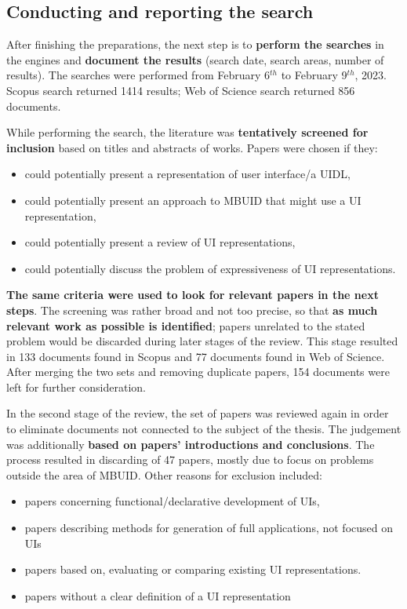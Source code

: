 \subsection{Conducting and reporting the search}\label{subsec:conducting-and-reporting-the-search}

After finishing the preparations, the next step is to \textbf{perform the searches} in the engines and \textbf{document the results} (search date, search areas, number of results).
The searches were performed from February 6$^{th}$ to February 9$^{th}$, 2023.
Scopus search returned 1414 results;
Web of Science search returned 856 documents.

While performing the search, the literature was \textbf{tentatively screened for inclusion} based on titles and abstracts of works.
Papers were chosen if they:
\begin{itemize}
    \item could potentially present a representation of user interface/a UIDL,
    \item could potentially present an approach to MBUID that might use a UI representation,
    \item could potentially present a review of UI representations,
    \item could potentially discuss the problem of expressiveness of UI representations.
\end{itemize}
\textbf{The same criteria were used to look for relevant papers in the next steps}.
The screening was rather broad and not too precise, so that \textbf{as much relevant work as possible is identified};
papers unrelated to the stated problem would be discarded during later stages of the review.
This stage resulted in 133 documents found in Scopus and 77 documents found in Web of Science.
After merging the two sets and removing duplicate papers, 154 documents were left for further consideration.

In the second stage of the review, the set of papers was reviewed again in order to eliminate documents not connected to the subject of the thesis.
The judgement was additionally \textbf{based on papers' introductions and conclusions}.
The process resulted in discarding of 47 papers, mostly due to focus on problems outside the area of MBUID\@.
Other reasons for exclusion included:
\begin{itemize}
    \item papers concerning functional/declarative development of UIs,
    \item papers describing methods for generation of full applications, not focused on UIs
    \item papers based on, evaluating or comparing existing UI representations.
    \item papers without a clear definition of a UI representation
\end{itemize}

